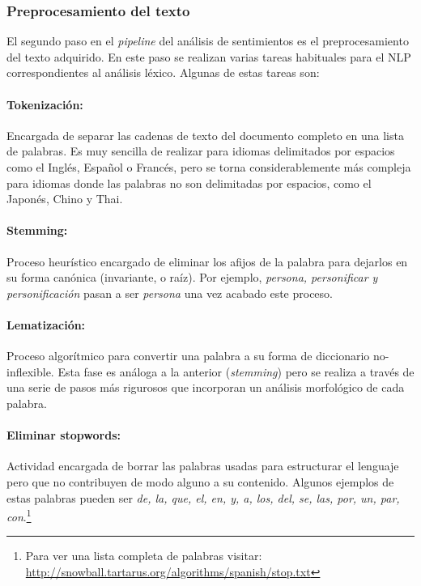 \subsubsection{Preprocesamiento del texto}
\label{sec:textpreprocesing}

El segundo paso en el \emph{pipeline} del análisis de sentimientos es el
preprocesamiento del texto adquirido. En este paso se realizan varias tareas
habituales para el \ac{NLP} correspondientes al análisis léxico. Algunas de
estas tareas son:

\paragraph{Tokenización:}Encargada de separar las cadenas de texto del documento
completo en una lista de palabras. Es muy sencilla de realizar para idiomas
delimitados por espacios como el Inglés, Español o Francés, pero se torna
considerablemente más compleja para idiomas donde las palabras no son
delimitadas por espacios, como el Japonés, Chino y Thai.

\paragraph{Stemming:}Proceso heurístico encargado de eliminar los afijos de la
palabra para dejarlos en su forma canónica (invariante, o raíz). Por ejemplo,
\emph{persona,  personificar y personificación} pasan a ser \emph{persona}
una vez acabado este proceso.

\paragraph{Lematización:}Proceso algorítmico para convertir una
palabra a su forma de diccionario no-inflexible. Esta fase es análoga a la
anterior (\emph{stemming}) pero se realiza a través de una serie de pasos más
rigurosos que incorporan un análisis morfológico de cada palabra.

\paragraph{Eliminar stopwords:} Actividad encargada de borrar las palabras
usadas para estructurar el lenguaje pero que no contribuyen de modo alguno a su
contenido. Algunos ejemplos de estas palabras pueden ser \emph{de, la, que, el,
  en, y, a, los, del, se, las, por, un, par, con}.\footnote{Para ver una lista
  completa de palabras visitar:
  \url{http://snowball.tartarus.org/algorithms/spanish/stop.txt}}

